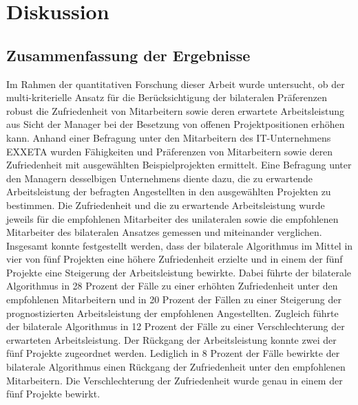 
\chapter{Diskussion}
\label{ch:diskussion}

\section{Zusammenfassung der Ergebnisse}
Im Rahmen der quantitativen Forschung dieser Arbeit wurde untersucht, ob der multi-kriterielle Ansatz für die Berücksichtigung der bilateralen Präferenzen robust die Zufriedenheit von Mitarbeitern sowie deren erwartete Arbeitsleistung aus Sicht der Manager bei der Besetzung von offenen Projektpositionen erhöhen kann.
Anhand einer Befragung unter den Mitarbeitern des IT-Unternehmens EXXETA wurden Fähigkeiten und Präferenzen von Mitarbeitern sowie deren Zufriedenheit mit ausgewählten Beispielprojekten ermittelt.
Eine Befragung unter den Managern desselbigen Unternehmens diente dazu, die zu erwartende Arbeitsleistung der befragten Angestellten in den ausgewählten Projekten zu bestimmen.
Die Zufriedenheit und die zu erwartende Arbeitsleistung wurde jeweils für die empfohlenen Mitarbeiter des unilateralen sowie die empfohlenen Mitarbeiter des bilateralen Ansatzes gemessen und miteinander verglichen.
Insgesamt konnte festgestellt werden, dass der bilaterale Algorithmus im Mittel in vier von fünf Projekten eine höhere Zufriedenheit erzielte und in einem der fünf Projekte eine Steigerung der Arbeitsleistung bewirkte.
Dabei führte der bilaterale Algorithmus in 28 Prozent der Fälle zu einer erhöhten Zufriedenheit unter den empfohlenen Mitarbeitern und in 20 Prozent der Fällen zu einer Steigerung der prognostizierten Arbeitsleistung der empfohlenen Angestellten.
Zugleich führte der bilaterale Algorithmus in 12 Prozent der Fälle zu einer Verschlechterung der erwarteten Arbeitsleistung.
Der Rückgang der Arbeitsleistung konnte zwei der fünf Projekte zugeordnet werden.
Lediglich in 8 Prozent der Fälle bewirkte der bilaterale Algorithmus einen Rückgang der Zufriedenheit unter den empfohlenen Mitarbeitern.
Die Verschlechterung der Zufriedenheit wurde genau in einem der fünf Projekte bewirkt.

